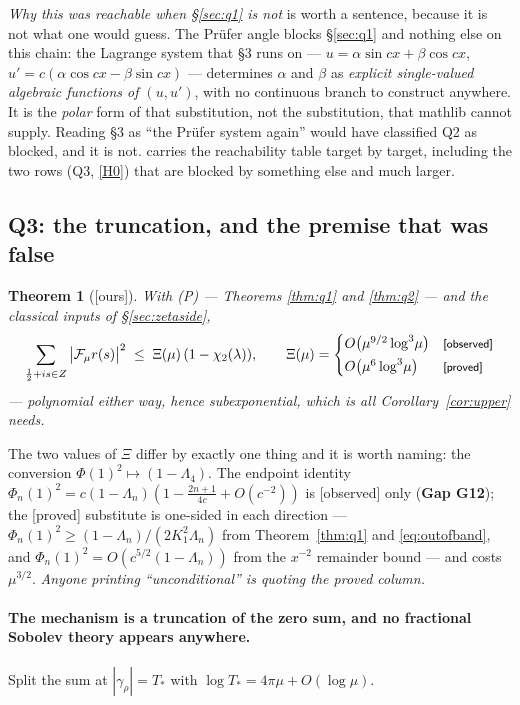 \documentclass[11pt,a4paper]{article}
\theoremstyle{plain}
\newtheorem{theorem}{Theorem}[section]
\theoremstyle{definition}
\theoremstyle{remark}
\newcommand{\st}[1]{{\normalfont\sffamily\footnotesize[#1]}}
\newcommand{\proved}{\st{proved}}
\newcommand{\observed}{\st{observed}}
\newcommand{\ours}{{\normalfont\sffamily\footnotesize[ours]}}
\newcommand{\F}{\mathcal{F}}
\newcommand{\file}[1]{\path{#1}}
\begin{document}
\emph{Why this was reachable when \S\ref{sec:q1} is not} is worth a sentence,
because it is not what one would guess.  The Pr\"ufer angle blocks
\S\ref{sec:q1} and nothing else on this chain: the Lagrange system that
\file{dilate-sum.md} \S3 runs on --- $u=\alpha\sin cx+\beta\cos cx$,
$u'=c(\alpha\cos cx-\beta\sin cx)$ --- determines $\alpha$ and $\beta$ as
\emph{explicit single-valued algebraic functions of $(u,u')$}, with no continuous
branch to construct anywhere.  It is the \emph{polar} form of that substitution,
not the substitution, that mathlib cannot supply.  Reading \S3 as ``the Pr\"ufer
system again'' would have classified Q2 as blocked, and it is not.
\file{lean/README.md} carries the reachability table target by target, including
the two rows (Q3, \eqref{H0}) that are blocked by something else and much larger.

\subsection{Q3: the truncation, and the premise that was false}
\label{sec:q3}

\begin{theorem}[\ours]\label{thm:q3}
With (P) --- Theorems \ref{thm:q1} and \ref{thm:q2} --- and the classical inputs
of \S\ref{sec:zetaside},
\[
  \sum_{\frac12+is\in Z}\big|\F_\mu r(s)\big|^2\;\le\;\Xi(\mu)\,(1-\chi_2(\lambda)),
  \qquad
  \Xi(\mu)=\begin{cases}
    O\big(\mu^{9/2}\log^3\!\mu\big) & \text{\observed}\\[2pt]
    O\big(\mu^{6}\log^3\!\mu\big) & \text{\proved}
  \end{cases}
\]
--- polynomial either way, hence subexponential, which is all
Corollary~\ref{cor:upper} needs.
\end{theorem}

The two values of $\Xi$ differ by exactly one thing and it is worth naming: the
conversion $\Phi(1)^2\mapsto(1-\Lambda_4)$.  The endpoint identity
$\Phi_n(1)^2=c(1-\Lambda_n)(1-\frac{2n+1}{4c}+O(c^{-2}))$ is \observed{} only
(\textbf{Gap G12}); the \proved{} substitute is one-sided in each direction ---
$\Phi_n(1)^2\ge(1-\Lambda_n)/(2K_1^2\Lambda_n)$ from Theorem~\ref{thm:q1} and
\eqref{eq:outofband}, and $\Phi_n(1)^2=O(c^{5/2}(1-\Lambda_n))$ from the
$x^{-2}$ remainder bound --- and costs $\mu^{3/2}$.  \emph{Anyone printing
``unconditional'' is quoting the proved column.}

\paragraph{The mechanism is a truncation of the zero sum, and no fractional
Sobolev theory appears anywhere.}  Split the sum at $|\gamma_\rho|=T_*$ with
$\log T_*=4\pi\mu+O(\log\mu)$.
\end{document}
